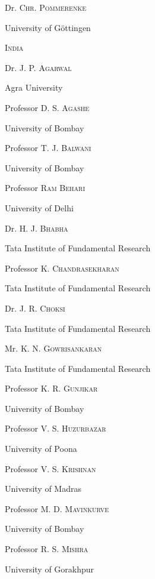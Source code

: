 Dr. \textsc{Chr. Pommerenke}

University of G\"ottingen

\medskip
\noindent
\textsc{India}

\smallskip
Dr. J. P. \textsc{Agarwal}

Agra University

\bigskip

Professor D. S. \textsc{Agashe}

University of Bombay

\bigskip

Professor T. J. \textsc{Balwani}

University of Bombay

\bigskip

Professor \textsc{Ram Behari}

University of Delhi

\bigskip

Dr. H. J. \textsc{Bhabha}

Tata Institute of Fundamental Research

\bigskip

Professor K. \textsc{Chandrasekharan}

Tata Institute of Fundamental Research

\bigskip
Dr. J. R. \textsc{Choksi}

Tata Institute of Fundamental Research

\bigskip

Mr. K. N. \textsc{Gowrisankaran}

Tata Institute of Fundamental Research

\bigskip

Professor K. R. \textsc{Gunjikar}

University of Bombay

\bigskip

Professor V. S. \textsc{Huzurbazar}

University of Poona

\bigskip

Professor V. S. \textsc{Krishnan}

University of Madras

\bigskip
 Professor M. D. \textsc{Mavinkurve}

University of Bombay

\bigskip

Professor R. S. \textsc{Mishra}

University of Gorakhpur

\bigskip

